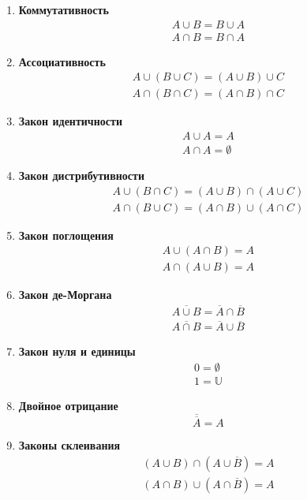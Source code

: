 \begin{enumerate}
    \item \textbf{Коммутативность}
        \begin{gather}
            A \cup B = B \cup A \\
            A \cap B = B \cap A
        \end{gather}

    \item \textbf{Ассоциативность}
        \begin{gather}
            A \cup (B \cup C) = (A \cup B) \cup C \\
            A \cap (B \cap C) = (A \cap B) \cap C
        \end{gather}

    \item \textbf{Закон идентичности}
        \begin{gather}
            A \cup A = A \\
            A \cap A = \emptyset
        \end{gather}

    \item \textbf{Закон дистрибутивности}
        \begin{gather}
            A \cup (B \cap C) = (A \cup B) \cap (A \cup C)\\
            A \cap (B \cup C) = (A \cap B) \cup (A \cap C)
        \end{gather}

    \item \textbf{Закон поглощения}
        \begin{gather}
            A \cup (A \cap B) = A \\
            A \cap (A \cup B) = A
        \end{gather}

    \item \textbf{Закон де-Моргана}
        \begin{gather}
            \overline{A \cup B} = \overline A \cap \overline B \\
            \overline{A \cap B} = \overline A \cup \overline B
        \end{gather}

    \item \textbf{Закон нуля и единицы}
        \begin{gather}
            0 = \emptyset \\
            1 = \mathbb{U}
        \end{gather}

    \item \textbf{Двойное отрицание}
        \begin{equation}
            \overline{\overline A} = A
        \end{equation}

    \item \textbf{Законы склеивания}
        \begin{gather}
            (A \cup B) \cap (A \cup \overline B) = A \\
            (A \cap B) \cup (A \cap \overline B) = A 
        \end{gather}
\end{enumerate}

